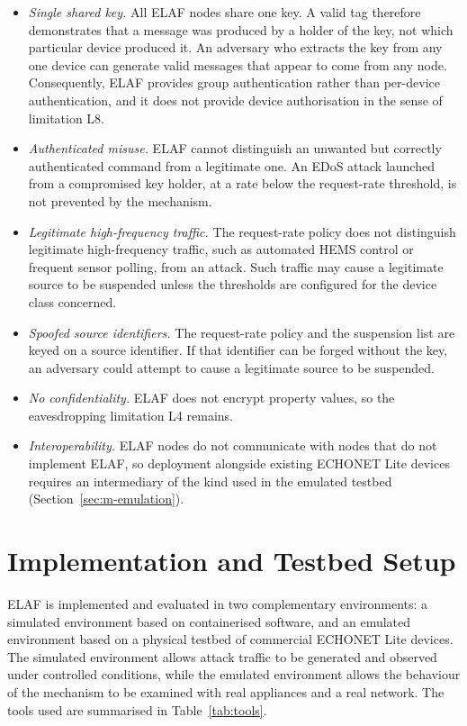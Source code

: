 \begin{itemize}
  \item \emph{Single shared key.} All ELAF nodes share one key. A valid tag therefore demonstrates that a message was produced by a holder of the key, not which particular device produced it. An adversary who extracts the key from any one device can generate valid messages that appear to come from any node. Consequently, ELAF provides group authentication rather than per-device authentication, and it does not provide device authorisation in the sense of limitation L8.
  \item \emph{Authenticated misuse.} ELAF cannot distinguish an unwanted but correctly authenticated command from a legitimate one. An EDoS attack launched from a compromised key holder, at a rate below the request-rate threshold, is not prevented by the mechanism.
  \item \emph{Legitimate high-frequency traffic.} The request-rate policy does not distinguish legitimate high-frequency traffic, such as automated HEMS control or frequent sensor polling, from an attack. Such traffic may cause a legitimate source to be suspended unless the thresholds are configured for the device class concerned.
  \item \emph{Spoofed source identifiers.} The request-rate policy and the suspension list are keyed on a source identifier. If that identifier can be forged without the key, an adversary could attempt to cause a legitimate source to be suspended.
  \item \emph{No confidentiality.} ELAF does not encrypt property values, so the eavesdropping limitation L4 remains.
  \item \emph{Interoperability.} ELAF nodes do not communicate with nodes that do not implement ELAF, so deployment alongside existing ECHONET Lite devices requires an intermediary of the kind used in the emulated testbed (Section~\ref{sec:m-emulation}).
\end{itemize}

\section{Implementation and Testbed Setup}
\label{sec:m-setup}

ELAF is implemented and evaluated in two complementary environments: a simulated environment based on containerised software, and an emulated environment based on a physical testbed of commercial ECHONET Lite devices. The simulated environment allows attack traffic to be generated and observed under controlled conditions, while the emulated environment allows the behaviour of the mechanism to be examined with real appliances and a real network. The tools used are summarised in Table~\ref{tab:tools}.

